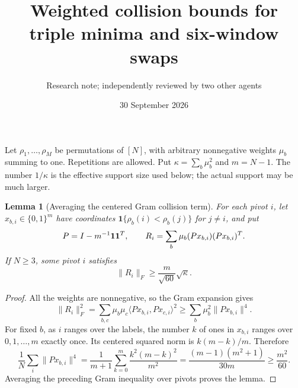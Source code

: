 \documentclass[11pt]{article}
\title{Weighted collision bounds for triple minima and six-window swaps}
\author{Research note; independently reviewed by two other agents}
\date{30 September 2026}
\newtheorem{lemma}[theorem]{Lemma}
\begin{document}
\maketitle

Let $\rho_1,\ldots,\rho_M$ be permutations of $[N]$, with arbitrary
nonnegative weights $\mu_b$ summing to one. Repetitions are allowed.
Put $\kappa=\sum_b\mu_b^2$ and $m=N-1$. The number $1/\kappa$ is
the effective support size used below; the actual support may be much
larger.

\begin{lemma}[Averaging the centered Gram collision term]\label{gram}
For each pivot $i$, let $x_{b,i}\in\{0,1\}^{m}$ have coordinates
$\mathbf1\{\rho_b(i)<\rho_b(j)\}$ for $j\ne i$, and put
\[
 P=I-m^{-1}{\bf1}{\bf1}^{T},\qquad
 R_i=\sum_b\mu_b(Px_{b,i})(Px_{b,i})^T.
\]
If $N\ge3$, some pivot $i$ satisfies
\[
 \|R_i\|_F\ge\frac m{\sqrt{60}}\sqrt\kappa.
\]
\end{lemma}
\begin{proof}
All the weights are nonnegative, so the Gram expansion gives
\[
 \|R_i\|_F^2
 =\sum_{b,c}\mu_b\mu_c
          \langle Px_{b,i},Px_{c,i}\rangle^2
 \ge\sum_b\mu_b^2\|Px_{b,i}\|^4.
\]
For fixed $b$, as $i$ ranges over the labels, the number $k$ of ones in
$x_{b,i}$ ranges over $0,1,\ldots,m$ exactly once. Its centered squared
norm is $k(m-k)/m$. Therefore
\[
 \frac1N\sum_i\|Px_{b,i}\|^4
 =\frac1{m+1}\sum_{k=0}^{m}\frac{k^2(m-k)^2}{m^2}
 =\frac{(m-1)(m^2+1)}{30m}\ge\frac{m^2}{60}.
\]
Averaging the preceding Gram inequality over pivots proves the lemma.
\end{proof}
\end{document}
